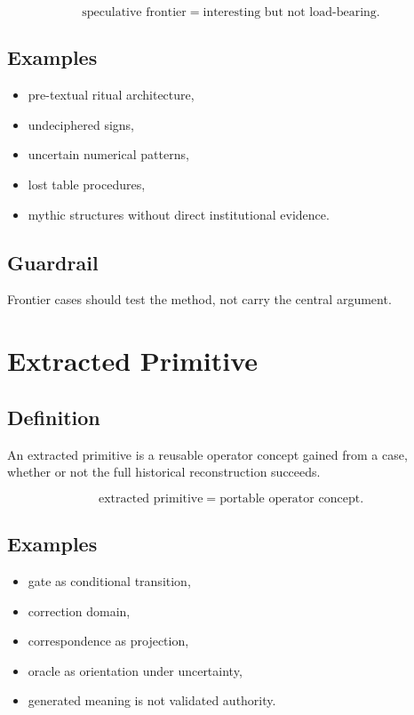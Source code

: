 \documentclass[11pt]{book}
\begin{document}
\[
\text{speculative frontier} = \text{interesting but not load-bearing}.
\]

\subsection*{Examples}

\begin{itemize}
    \item pre-textual ritual architecture,
    \item undeciphered signs,
    \item uncertain numerical patterns,
    \item lost table procedures,
    \item mythic structures without direct institutional evidence.
\end{itemize}

\subsection*{Guardrail}

Frontier cases should test the method, not carry the central argument.

\section{Extracted Primitive}

\subsection*{Definition}

An extracted primitive is a reusable operator concept gained from a case, whether or not the full historical reconstruction succeeds.

\[
\text{extracted primitive} = \text{portable operator concept}.
\]

\subsection*{Examples}

\begin{itemize}
    \item gate as conditional transition,
    \item correction domain,
    \item correspondence as projection,
    \item oracle as orientation under uncertainty,
    \item generated meaning is not validated authority.
\end{itemize}
\end{document}
